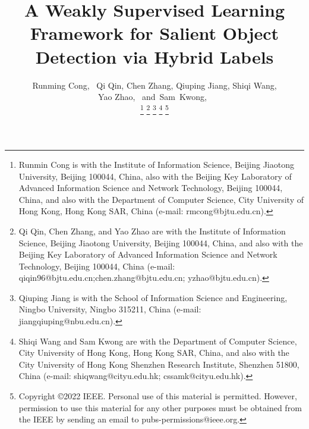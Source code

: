 \documentclass[journal]{IEEEtran}
\begin{document}
\title{A Weakly Supervised Learning Framework for Salient Object Detection via Hybrid Labels}


\author{Runming Cong,~
        Qi Qin,
        Chen Zhang,
        Qiuping Jiang,
        Shiqi Wang,\\
        Yao Zhao,~
        and~Sam~Kwong,~

\thanks{Runmin Cong is with the Institute of Information Science, Beijing Jiaotong University, Beijing 100044, China, also with the Beijing Key Laboratory of Advanced Information Science and Network Technology, Beijing 100044, China, and also with the Department of Computer Science, City University of Hong Kong, Hong Kong SAR, China (e-mail: rmcong@bjtu.edu.cn).}
\thanks{Qi Qin, Chen Zhang, and Yao Zhao are with the Institute of Information Science, Beijing Jiaotong University, Beijing 100044, China, and also with the Beijing Key Laboratory of Advanced Information Science and Network Technology, Beijing 100044, China (e-mail: qiqin96@bjtu.edu.cn;chen.zhang@bjtu.edu.cn; yzhao@bjtu.edu.cn).}
\thanks{Qiuping Jiang is with the School of Information Science and Engineering, Ningbo University, Ningbo 315211, China (e-mail: jiangqiuping@nbu.edu.cn).}
\thanks{Shiqi Wang and Sam Kwong are with the Department of Computer Science, City University of Hong Kong, Hong Kong SAR, China, and also with the City University of Hong Kong Shenzhen Research Institute, Shenzhen 51800, China (e-mail: shiqwang@cityu.edu.hk; cssamk@cityu.edu.hk).}
\thanks{Copyright \copyright 2022 IEEE. Personal use of this material is permitted. However, permission to use this material for any other purposes must be obtained from the IEEE by sending an email to pubs-permissions@ieee.org.}
}



















\maketitle
\end{document}
